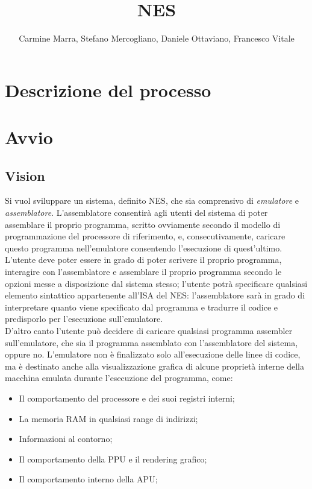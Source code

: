 \documentclass[11pt]{article}
\begin{document}
\title{NES}
\author{Carmine Marra, Stefano Mercogliano, Daniele Ottaviano, Francesco Vitale}
\date{}
\maketitle
\clearpage
\section{Descrizione del processo}

\section{Avvio}
\subsection{Vision}
Si vuol sviluppare un sistema, definito NES, che sia comprensivo di \emph{emulatore} e \emph{assemblatore}. L'assemblatore consentirà agli utenti del sistema di poter assemblare il proprio programma, scritto ovviamente secondo il modello di programmazione del processore di riferimento, e, consecutivamente, caricare questo programma nell'emulatore consentendo l'esecuzione di quest'ultimo.\\
L'utente deve poter essere in grado di poter scrivere il proprio programma, interagire con l'assemblatore e assemblare il proprio programma secondo le opzioni messe a disposizione dal sistema stesso; l'utente potrà specificare qualsiasi elemento sintattico appartenente all'ISA del NES: l'assemblatore sarà in grado di interpretare quanto viene specificato dal programma e tradurre il codice e predisporlo per l'esecuzione sull'emulatore.\\
D'altro canto l'utente può decidere di caricare qualsiasi programma assembler sull'emulatore, che sia il programma assemblato con l'assemblatore del sistema, oppure no. L'emulatore non è finalizzato solo all'esecuzione delle linee di codice, ma è destinato anche alla visualizzazione grafica di alcune proprietà interne della macchina emulata durante l'esecuzione del programma, come:
\begin{itemize}
	\item{
		Il comportamento del processore e dei suoi registri interni;
	}
	\item{
		La memoria RAM in qualsiasi range di indirizzi;
	}
	\item{
		Informazioni al contorno;
	}
	\item{
		Il comportamento della PPU e il rendering grafico;
	}
	\item{
		Il comportamento interno della APU;
	}
\end{itemize}
\clearpage
\end{document}
